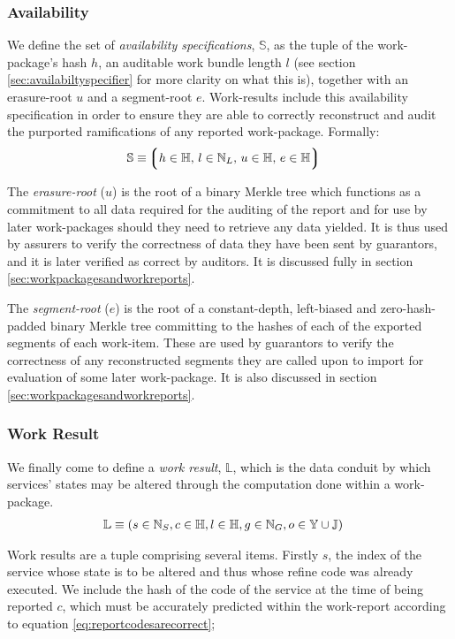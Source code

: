 \subsubsection{Availability}
We define the set of \emph{availability specifications}, $\mathbb{S}$, as the tuple of the work-package's hash $h$, an auditable work bundle length $l$ (see section \ref{sec:availabiltyspecifier} for more clarity on what this is), together with an erasure-root $u$ and a segment-root $e$. Work-results include this availability specification in order to ensure they are able to correctly reconstruct and audit the purported ramifications of any reported work-package. Formally:
\begin{align}
  \mathbb{S} &\equiv \tuple{
    \isa{h}{\H}\ts
    \isa{l}{\N_L}\ts
    \isa{u}{\H}\ts
    \isa{e}{\H}
  }
\end{align}

The \emph{erasure-root} ($u$) is the root of a binary Merkle tree which functions as a commitment to all data required for the auditing of the report and for use by later work-packages should they need to retrieve any data yielded. It is thus used by assurers to verify the correctness of data they have been sent by guarantors, and it is later verified as correct by auditors. It is discussed fully in section \ref{sec:workpackagesandworkreports}.

The \emph{segment-root} ($e$) is the root of a constant-depth, left-biased and zero-hash-padded binary Merkle tree committing to the hashes of each of the exported segments of each work-item. These are used by guarantors to verify the correctness of any reconstructed segments they are called upon to import for evaluation of some later work-package. It is also discussed in section \ref{sec:workpackagesandworkreports}.

\subsubsection{Work Result}
We finally come to define a \emph{work result}, $\mathbb{L}$, which is the data conduit by which services' states may be altered through the computation done within a work-package.
\begin{align}\label{eq:workresult}
  \mathbb{L} &\equiv (s \in \mathbb{N}_S, c \in \mathbb{H}, l \in \mathbb{H}, g \in \mathbb{N}_G, o \in \mathbb{Y} \cup \mathbb{J})
\end{align}

Work results are a tuple comprising several items. Firstly $s$, the index of the service whose state is to be altered and thus whose refine code was already executed. We include the hash of the code of the service at the time of being reported $c$, which must be accurately predicted within the work-report according to equation \ref{eq:reportcodesarecorrect};


